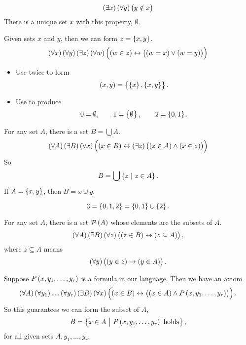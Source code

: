 \begin{axiom**}
$$ \teb{x}\fab{y}\nib{y}{x} $$
There is a unique set $ x $ with this property, $ \emptyset $.
\end{axiom**}


\begin{axiom**}
Given sets $ x $ and $ y $, then we can form $ z = \cbr{x, y} $.
$$ \fab{x}\fab{y}\teb{z}\fab{w}\iffb{\inb{w}{z}}{\orb{\eqb{w}{x}}{\eqb{w}{y}}} $$
\end{axiom**}

\begin{remark*}
\hfill
\begin{itemize}
\item Use twice to form
$$ \br{x, y} = \cbr{\cbr{x}, \cbr{x, y}}. $$
\item Use to produce
$$ 0 = \emptyset, \qquad 1 = \cbr{\emptyset}, \qquad 2 = \cbr{0, 1}. $$
\end{itemize}
\end{remark*}

\pagebreak

\begin{axiom**}
For any set $ A $, there is a set $ B = \bigcup A $.
$$ \fab{A}\teb{B}\fab{x}\iffb{\inb{x}{B}}{\teb{z}\andb{\inb{z}{A}}{\inb{x}{z}}} $$
So
$$ B = \bigcup \cbr{z \st z \in A}. $$
If $ A = \cbr{x, y} $, then $ B = x \cup y $.
\end{axiom**}

\begin{example*}
$$ 3 = \cbr{0, 1, 2} = \cbr{0, 1} \cup \cbr{2}. $$
\end{example*}

\begin{axiom**}
For any set $ A $, there is a set $ \PPP\br{A} $ whose elements are the subsets of $ A $.
$$ \fab{A}\teb{B}\fab{z}\iffb{\inb{z}{B}}{\subb{z}{A}}, $$
where $ z \subseteq A $ means
$$ \fab{y}\impb{\inb{y}{z}}{\inb{y}{A}}. $$
\end{axiom**}

\begin{axiom**}
Suppose $ P\br{x, y_1, \dots, y_r} $ is a formula in our language. Then we have an axiom
$$ \fab{A}\fab{y_1} \dots \fab{y_r}\teb{B}\fab{x}\iffb{\inb{x}{B}}{\andb{\inb{x}{A}}{P\br{x, y_1, \dots, y_r}}}. $$
So this guarantees we can form the subset of $ A $,
$$ B = \cbr{x \in A \st P\br{x, y_1, \dots, y_r} \ \text{holds}}, $$
for all given sets $ A, y_1, \dots, y_r $.
\end{axiom**}

